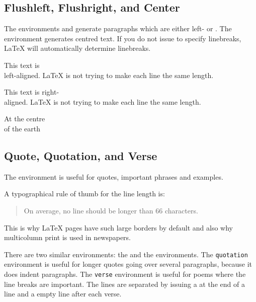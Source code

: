 \subsection{Flushleft, Flushright, and Center}

The environments  and  generate
paragraphs which are either left- or .  The  environment generates centred text. If you
do not issue \ci{\bs} to specify linebreaks, \LaTeX{} will
automatically determine linebreaks.

\begin{example}
\begin{flushleft}
This text is\\ left-aligned. 
\LaTeX{} is not trying to make 
each line the same length.
\end{flushleft}
\end{example}

\begin{example}
\begin{flushright}
This text is right-\\aligned. 
\LaTeX{} is not trying to make
each line the same length.
\end{flushright}
\end{example}

\begin{example}
\begin{center}
At the centre\\of the earth
\end{center}
\end{example}

\subsection{Quote, Quotation, and Verse}

The  environment is useful for quotes, important phrases and
examples.

\begin{example}
A typographical rule of thumb
for the line length is:
\begin{quote}
On average, no line should
be longer than 66 characters.
\end{quote}
This is why \LaTeX{} pages have 
such large borders by default and
also why multicolumn print is
used in newspapers.
\end{example}

There are two similar environments: the  and the
 environments. The \texttt{quotation} environment is useful
for longer quotes going over several paragraphs, because it does
indent paragraphs. The \texttt{verse} environment is useful for poems
where the line breaks are important. The lines are separated by
issuing a \ci{\bs} at the end of a line and a empty line after each
verse.


